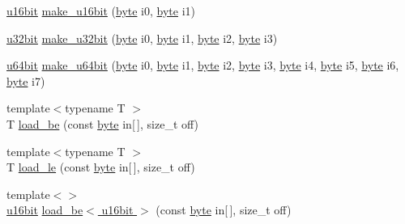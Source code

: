 \begin{DoxyCompactItemize}
\item 
\hyperlink{namespaceBotan_ab07face63a00c39ea6ed97f203ee501c}{u16bit} \hyperlink{namespaceBotan_a78d9a64949dccaaf46457e610eae4129}{make\-\_\-u16bit} (\hyperlink{namespaceBotan_a7d793989d801281df48c6b19616b8b84}{byte} i0, \hyperlink{namespaceBotan_a7d793989d801281df48c6b19616b8b84}{byte} i1)
\item 
\hyperlink{namespaceBotan_aacc7d03c95e97e76168fc1c819031830}{u32bit} \hyperlink{namespaceBotan_a744a8bc0f5ac734de9250b369e05511d}{make\-\_\-u32bit} (\hyperlink{namespaceBotan_a7d793989d801281df48c6b19616b8b84}{byte} i0, \hyperlink{namespaceBotan_a7d793989d801281df48c6b19616b8b84}{byte} i1, \hyperlink{namespaceBotan_a7d793989d801281df48c6b19616b8b84}{byte} i2, \hyperlink{namespaceBotan_a7d793989d801281df48c6b19616b8b84}{byte} i3)
\item 
\hyperlink{namespaceBotan_a634063d9fb05e25262ca94ed927030f6}{u64bit} \hyperlink{namespaceBotan_a5ad0aa71bc51290ba07554b1882b27dd}{make\-\_\-u64bit} (\hyperlink{namespaceBotan_a7d793989d801281df48c6b19616b8b84}{byte} i0, \hyperlink{namespaceBotan_a7d793989d801281df48c6b19616b8b84}{byte} i1, \hyperlink{namespaceBotan_a7d793989d801281df48c6b19616b8b84}{byte} i2, \hyperlink{namespaceBotan_a7d793989d801281df48c6b19616b8b84}{byte} i3, \hyperlink{namespaceBotan_a7d793989d801281df48c6b19616b8b84}{byte} i4, \hyperlink{namespaceBotan_a7d793989d801281df48c6b19616b8b84}{byte} i5, \hyperlink{namespaceBotan_a7d793989d801281df48c6b19616b8b84}{byte} i6, \hyperlink{namespaceBotan_a7d793989d801281df48c6b19616b8b84}{byte} i7)
\item 
{\footnotesize template$<$typename T $>$ }\\T \hyperlink{namespaceBotan_a59a5b42de7cea29182d330feb9783119}{load\-\_\-be} (const \hyperlink{namespaceBotan_a7d793989d801281df48c6b19616b8b84}{byte} in\mbox{[}$\,$\mbox{]}, size\-\_\-t off)
\item 
{\footnotesize template$<$typename T $>$ }\\T \hyperlink{namespaceBotan_a747e99b4661bf56ed9aba4658e4206df}{load\-\_\-le} (const \hyperlink{namespaceBotan_a7d793989d801281df48c6b19616b8b84}{byte} in\mbox{[}$\,$\mbox{]}, size\-\_\-t off)
\item 
{\footnotesize template$<$$>$ }\\\hyperlink{namespaceBotan_ab07face63a00c39ea6ed97f203ee501c}{u16bit} \hyperlink{namespaceBotan_acb7a761e64b308d88e97d300ed0ec8ed}{load\-\_\-be$<$ u16bit $>$} (const \hyperlink{namespaceBotan_a7d793989d801281df48c6b19616b8b84}{byte} in\mbox{[}$\,$\mbox{]}, size\-\_\-t off)

\end{DoxyCompactItemize}
